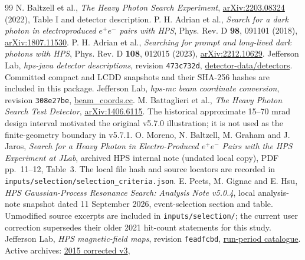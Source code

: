 \begin{thebibliography}{99}
 N. Baltzell et al., \emph{The Heavy Photon Search Experiment},
\href{https://arxiv.org/abs/2203.08324}{arXiv:2203.08324} (2022), Table I and detector description.
 P. H. Adrian et al., \emph{Search for a dark photon in electroproduced
$e^+e^-$ pairs with HPS}, Phys. Rev. D \textbf{98}, 091101 (2018),
\href{https://arxiv.org/abs/1807.11530}{arXiv:1807.11530}.
 P. H. Adrian et al., \emph{Searching for prompt and long-lived dark
photons with HPS}, Phys. Rev. D \textbf{108}, 012015 (2023),
\href{https://arxiv.org/abs/2212.10629}{arXiv:2212.10629}.
 Jefferson Lab, \emph{hps-java detector descriptions},
revision \texttt{473c732d},
\href{https://github.com/JeffersonLab/hps-java/tree/473c732dafaebdd3f58389cd1052a35c60098a23/detector-data/detectors}{detector-data/detectors}.
Committed compact and LCDD snapshots and their SHA-256 hashes are included in this package.
 Jefferson Lab, \emph{hps-mc beam coordinate conversion},
revision \texttt{308e27be},
\href{https://github.com/JeffersonLab/hps-mc/blob/308e27be7821f1aad406cb8060602a10fca2d37a/tools/stdhep-tools/src/beam_coords.cc}{beam\_coords.cc}.
 M. Battaglieri et al., \emph{The Heavy Photon Search Test Detector},
\href{https://arxiv.org/abs/1406.6115}{arXiv:1406.6115}.
The historical approximate 15--70 mrad design interval motivated the original v5.7.0 illustration;
it is not used as the finite-geometry boundary in v5.7.1.
 O. Moreno, N. Baltzell, M. Graham and J. Jaros,
\emph{Search for a Heavy Photon in Electro-Produced $e^+e^-$ Pairs with the HPS Experiment at JLab},
archived HPS internal note (undated local copy), PDF pp.~11--12, Table~3.
The local file hash and source locators are recorded in
\nolinkurl{inputs/selection/selection_criteria.json}.
 E. Peets, M. Gignac and E. Hsu,
\emph{HPS Gaussian-Process Resonance Search: Analysis Note v5.0.4},
local analysis-note snapshot dated 11 September 2026, event-selection section and table.
Unmodified source excerpts are included in \nolinkurl{inputs/selection/};
the current user correction supersedes their older 2021 hit-count statements for this study.
 Jefferson Lab, \emph{HPS magnetic-field maps},
revision \texttt{feadfcbd}, \href{https://github.com/JeffersonLab/hps-fieldmaps/blob/feadfcbd17bdee8515cd962d75a90ba1534fa888/README.md}{run-period catalogue}.
Active archives: \href{https://raw.githubusercontent.com/JeffersonLab/hps-fieldmaps/feadfcbd17bdee8515cd962d75a90ba1534fa888/125acm2_3kg_corrected_unfolded_scaled_0.7992_v3.tar.gz}{2015 corrected v3},

\end{thebibliography}
